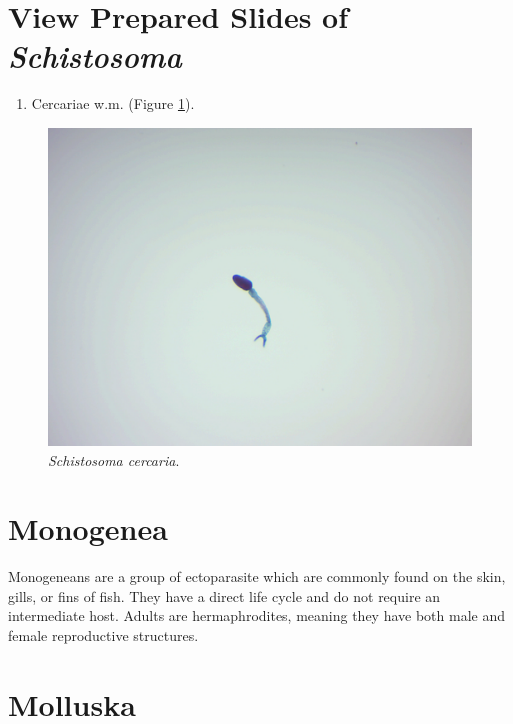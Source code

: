 \section{\texorpdfstring{View Prepared Slides of
\emph{Schistosoma}}{View Prepared Slides of Schistosoma}}\label{view-prepared-slides-of-schistosoma}

\begin{enumerate}
\def\labelenumi{\arabic{enumi}.}
\tightlist
\item
  Cercariae w.m. (Figure \ref{fig:cercaria}).
\end{enumerate}

\begin{figure}

{\centering \includegraphics[width=0.7\linewidth]{./figures/rotifera/cercaria}

}

\caption{\emph{Schistosoma cercaria}.}\label{fig:cercaria}
\end{figure}

\section{Monogenea}\label{monogenea}

Monogeneans are a group of ectoparasite which are commonly found on the
skin, gills, or fins of fish. They have a direct life cycle and do not
require an intermediate host. Adults are hermaphrodites, meaning they
have both male and female reproductive structures.

\section{Molluska}\label{molluska}

